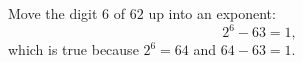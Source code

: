 Move the digit $6$ of $62$ up into an exponent:
\[\boxed{2^6-63=1},\]
which is true because $2^6=64$ and $64-63=1$.
